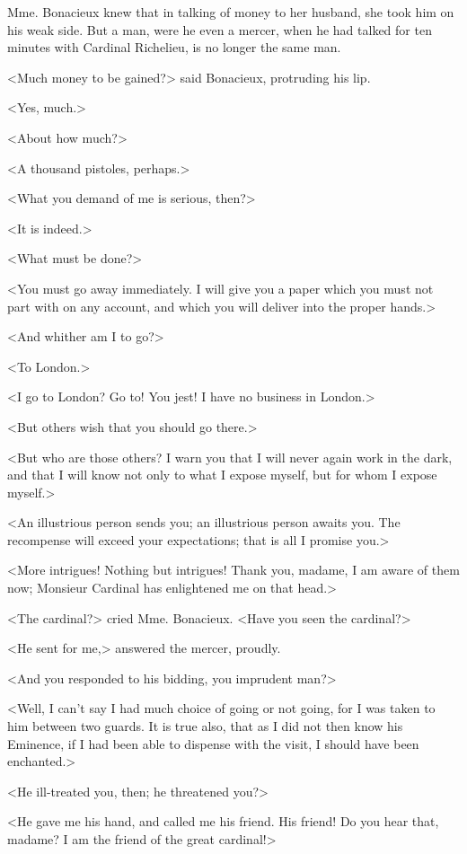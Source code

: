 Mme. Bonacieux knew that in talking of money to her husband, she took him on his weak side. But a man, were he even a mercer, when he had talked for ten minutes with Cardinal Richelieu, is no longer the same man. 

<Much money to be gained?> said Bonacieux, protruding his lip. 

<Yes, much.> 

<About how much?> 

<A thousand pistoles, perhaps.> 

<What you demand of me is serious, then?> 

<It is indeed.> 

<What must be done?> 

<You must go away immediately. I will give you a paper which you must not part with on any account, and which you will deliver into the proper hands.> 

<And whither am I to go?> 

<To London.> 

<I go to London? Go to! You jest! I have no business in London.> 

<But others wish that you should go there.> 

<But who are those others? I warn you that I will never again work in the dark, and that I will know not only to what I expose myself, but for whom I expose myself.> 

<An illustrious person sends you; an illustrious person awaits you. The recompense will exceed your expectations; that is all I promise you.> 

<More intrigues! Nothing but intrigues! Thank you, madame, I am aware of them now; Monsieur Cardinal has enlightened me on that head.> 

<The cardinal?> cried Mme. Bonacieux. <Have you seen the cardinal?> 

<He sent for me,> answered the mercer, proudly. 

<And you responded to his bidding, you imprudent man?> 

<Well, I can't say I had much choice of going or not going, for I was taken to him between two guards. It is true also, that as I did not then know his Eminence, if I had been able to dispense with the visit, I should have been enchanted.> 

<He ill-treated you, then; he threatened you?> 

<He gave me his hand, and called me his friend. His friend! Do you hear that, madame? I am the friend of the great cardinal!> 

